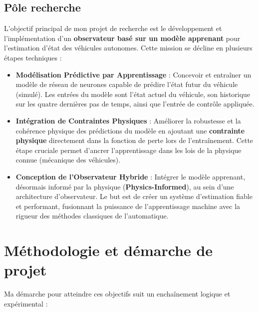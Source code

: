 \documentclass[12pt, a4paper]{report}
\begin{document}
\subsection{Pôle recherche}

L'objectif principal de mon projet de recherche est le développement et l'implémentation d'un \textbf{observateur basé sur un modèle apprenant} pour l'estimation d'état des véhicules autonomes. Cette mission se décline en plusieurs étapes techniques :

\begin{itemize}
    \item \textbf{Modélisation Prédictive par Apprentissage} : Concevoir et entraîner un modèle de réseau de neurones capable de prédire l'état futur du véhicule (simulé). Les entrées du modèle sont l'état actuel du véhicule, son historique sur les quatre dernières pas de temps, ainsi que l'entrée de contrôle appliquée.
    \item \textbf{Intégration de Contraintes Physiques} : Améliorer la robustesse et la cohérence physique des prédictions du modèle en ajoutant une \textbf{contrainte physique} directement dans la fonction de perte lors de l'entraînement. Cette étape cruciale permet d'ancrer l'apprentissage dans les lois de la physique connue (mécanique des véhicules).
    \item \textbf{Conception de l'Observateur Hybride} : Intégrer le modèle apprenant, désormais informé par la physique (\textbf{Physics-Informed}), au sein d'une architecture d'observateur. Le but est de créer un système d'estimation fiable et performant, fusionnant la puissance de l'apprentissage machine avec la rigueur des méthodes classiques de l'automatique.
\end{itemize}

\section{Méthodologie et démarche de projet}

Ma démarche pour atteindre ces objectifs suit un enchaînement logique et expérimental :
\end{document}
